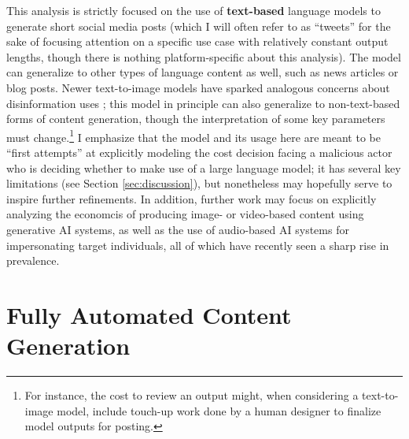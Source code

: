 \documentclass{article}
\begin{document}
This analysis is strictly focused on the use of \textbf{text-based} language models to generate short social media posts (which I will often refer to as ``tweets'' for the sake of focusing attention on a specific use case with relatively constant output lengths, though there is nothing platform-specific about this analysis). The model can generalize to other types of language content as well, such as news articles or blog posts. Newer text-to-image models have sparked analogous concerns about disinformation uses \cite{DRI, hwang, wapo}; this model in principle can also generalize to non-text-based forms of content generation, though the interpretation of some key parameters must change.\footnote{For instance, the cost to review an output might, when considering a text-to-image model, include touch-up work done by a human designer to finalize model outputs for posting.} I emphasize that the model and its usage here are meant to be ``first attempts'' at explicitly modeling the cost decision facing a malicious actor who is deciding whether to make use of a large language model; it has several key limitations (see Section \ref{sec:discussion}), but nonetheless may hopefully serve to inspire further refinements. In addition, further work may focus on explicitly analyzing the economcis of producing image- or video-based content using generative AI systems, as well as the use of audio-based AI systems for impersonating target individuals, all of which have recently seen a sharp rise in prevalence. \cite{mcafee, videodeepfakes}

\section{Fully Automated Content Generation}
\label{sec:automation}
\end{document}
